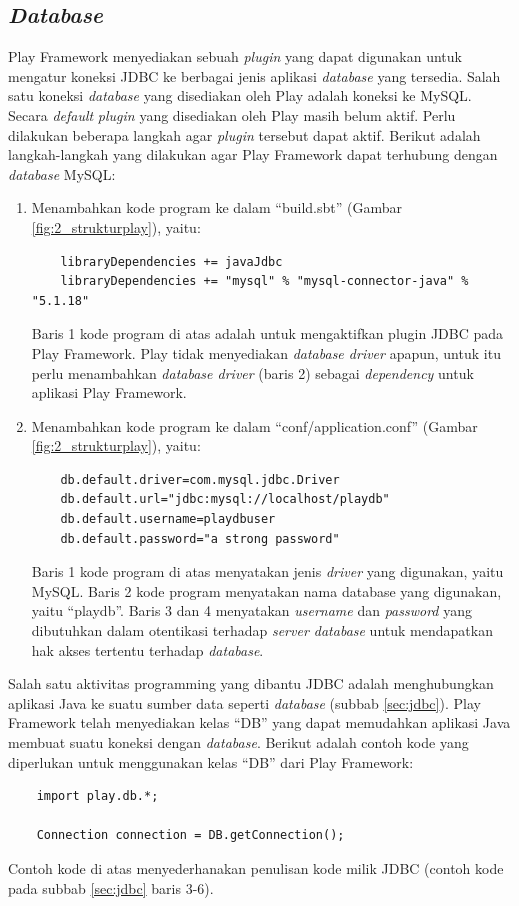 \subsection{\textit{Database}}
\label{sec:database}
Play Framework menyediakan sebuah \textit{plugin} yang dapat digunakan untuk mengatur koneksi JDBC ke berbagai jenis aplikasi \textit{database} yang tersedia\cite{playframeworkweb}. Salah satu koneksi \textit{database} yang disediakan oleh Play adalah koneksi ke MySQL. Secara \textit{default} \textit{plugin} yang disediakan oleh Play masih belum aktif. Perlu dilakukan beberapa langkah agar \textit{plugin} tersebut dapat aktif. Berikut adalah langkah-langkah yang dilakukan agar Play Framework dapat terhubung dengan \textit{database} MySQL:
\begin{enumerate}
	\item Menambahkan kode program ke dalam ``build.sbt'' (Gambar \ref{fig:2_strukturplay}), yaitu:
	
	\begin{lstlisting}
	libraryDependencies += javaJdbc
	libraryDependencies += "mysql" % "mysql-connector-java" % "5.1.18"
	\end{lstlisting}
	
	Baris 1 kode program di atas adalah untuk mengaktifkan plugin JDBC pada Play Framework. Play tidak menyediakan \textit{database driver} apapun, untuk itu perlu menambahkan \textit{database driver} (baris 2) sebagai \textit{dependency} untuk aplikasi Play Framework.
	
	\item Menambahkan kode program ke dalam ``conf/application.conf'' (Gambar \ref{fig:2_strukturplay}), yaitu:
	
	\begin{lstlisting}
	db.default.driver=com.mysql.jdbc.Driver
	db.default.url="jdbc:mysql://localhost/playdb"
	db.default.username=playdbuser
	db.default.password="a strong password"
	\end{lstlisting}
	
	Baris 1 kode program di atas menyatakan jenis \textit{driver} yang digunakan, yaitu MySQL. Baris 2 kode program menyatakan nama database yang digunakan, yaitu ``playdb''. Baris 3 dan 4 menyatakan \textit{username} dan \textit{password} yang dibutuhkan dalam otentikasi terhadap \textit{server database} untuk mendapatkan hak akses tertentu terhadap \textit{database}.
\end{enumerate}

	Salah satu aktivitas programming yang dibantu JDBC adalah menghubungkan aplikasi Java ke suatu sumber data seperti \textit{database} (subbab \ref{sec:jdbc}). Play Framework telah menyediakan kelas ``DB'' yang dapat memudahkan aplikasi Java membuat suatu koneksi dengan \textit{database}. Berikut adalah contoh kode yang diperlukan untuk menggunakan kelas ``DB'' dari Play Framework:
	\begin{lstlisting}
	import play.db.*;

	Connection connection = DB.getConnection();
	\end{lstlisting}
	Contoh kode di atas menyederhanakan penulisan kode milik JDBC (contoh kode pada subbab \ref{sec:jdbc} baris 3-6). 
	
